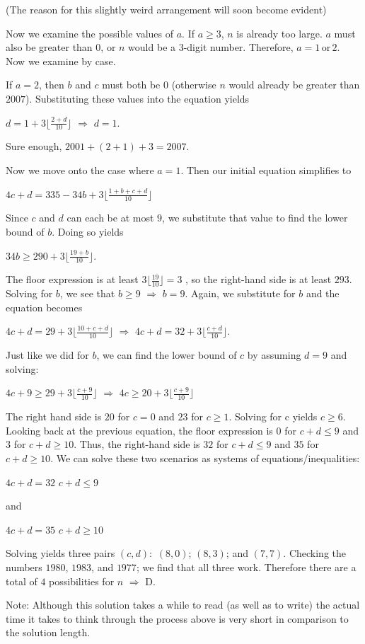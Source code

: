\begin{enumerate}
 
(The reason for this slightly weird arrangement will soon become evident)

 
Now we examine the possible values of $a$. If $a \ge 3$, $n$ is already too large. $a$ must also be greater than $0$, or $n$ would be a $3$-digit number. Therefore, $a = 1 \, \text{or} \, 2$. Now we examine by case.

 If $a = 2$, then $b$ and $c$ must both be $0$ (otherwise $n$ would already be greater than $2007$). Substituting these values into the equation yields

 
$d = 1 + 3\lfloor\frac{2 + d}{10}\rfloor$
$\Rightarrow$ $d=1$.

 
Sure enough, $2001 + (2+1) + 3=2007$.

 Now we move onto the case where $a = 1$. Then our initial equation simplifies to

 
$4c + d = 335 - 34b + 3\lfloor\frac{1 + b + c + d}{10}\rfloor$

 
Since $c$ and $d$ can each be at most $9$, we substitute that value to find the lower bound of $b$. Doing so yields

 
$34b \ge 290 + 3\lfloor\frac{19 + b}{10}\rfloor$.

 
The floor expression is at least $3\lfloor\frac{19}{10}\rfloor=3$ , so the right-hand side is at least $293$. Solving for $b$, we see that $b \ge 9$ $\Rightarrow$ $b=9$. Again, we substitute for $b$ and the equation becomes

 
$4c + d = 29 + 3\lfloor\frac{10 + c + d}{10}\rfloor$
$\Rightarrow$ $4c + d = 32 + 3\lfloor\frac{c + d}{10}\rfloor$.

 
Just like we did for $b$, we can find the lower bound of $c$ by assuming $d = 9$ and solving:

 
$4c + 9 \ge 29 + 3\lfloor\frac{c + 9}{10}\rfloor$
$\Rightarrow$ $4c \ge 20 + 3\lfloor\frac{c + 9}{10}\rfloor$

 
The right hand side is $20$ for $c=0$ and $23$ for $c \ge 1$. Solving for c yields $c \ge 6$. Looking back at the previous equation, the floor expression is $0$ for $c+d \le 9$ and $3$ for $c+d \ge 10$. Thus, the right-hand side is $32$ for $c+d \le 9$ and $35$ for $c+d \ge 10$. We can solve these two scenarios as systems of equations/inequalities:

 $4c+d = 32$
$c+d \le 9$

 and

 $4c+d=35$
$c+d \ge 10$

 Solving yields three pairs $(c, d):$ $(8, 0)$; $(8, 3)$; and $(7, 7)$. Checking the numbers $1980$, $1983$, and $1977$; we find that all three work. Therefore there are a total of $4$ possibilities for $n$ $\Rightarrow$ $\boxed{\text{D}}$.

 Note: Although this solution takes a while to read (as well as to write) the actual time it takes to think through the process above is very short in comparison to the solution length.

 


\end{enumerate}